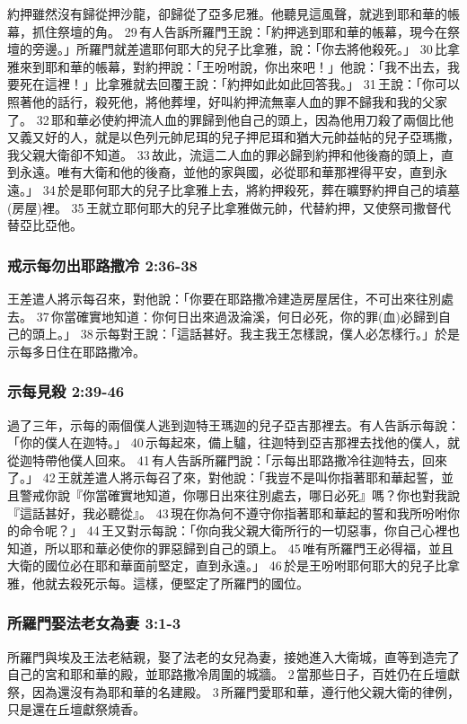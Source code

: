 約押雖然沒有歸從押沙龍，卻歸從了亞多尼雅。他聽見這風聲，就逃到耶和華的帳幕，抓住祭壇的角。 29 有人告訴所羅門王說：「約押逃到耶和華的帳幕，現今在祭壇的旁邊。」所羅門就差遣耶何耶大的兒子比拿雅，說：「你去將他殺死。」 30 比拿雅來到耶和華的帳幕，對約押說：「王吩咐說，你出來吧！」他說：「我不出去，我要死在這裡！」比拿雅就去回覆王說：「約押如此如此回答我。」 31 王說：「你可以照著他的話行，殺死他，將他葬埋，好叫約押流無辜人血的罪不歸我和我的父家了。 32 耶和華必使約押流人血的罪歸到他自己的頭上，因為他用刀殺了兩個比他又義又好的人，就是以色列元帥尼珥的兒子押尼珥和猶大元帥益帖的兒子亞瑪撒，我父親大衛卻不知道。 33 故此，流這二人血的罪必歸到約押和他後裔的頭上，直到永遠。唯有大衛和他的後裔，並他的家與國，必從耶和華那裡得平安，直到永遠。」 34 於是耶何耶大的兒子比拿雅上去，將約押殺死，葬在曠野約押自己的墳墓(房屋)裡。 35 王就立耶何耶大的兒子比拿雅做元帥，代替約押，又使祭司撒督代替亞比亞他。

\subsubsection{戒示每勿出耶路撒冷 2:36-38}
王差遣人將示每召來，對他說：「你要在耶路撒冷建造房屋居住，不可出來往別處去。 37 你當確實地知道：你何日出來過汲淪溪，何日必死，你的罪(血)必歸到自己的頭上。」 38 示每對王說：「這話甚好。我主我王怎樣說，僕人必怎樣行。」於是示每多日住在耶路撒冷。


\subsubsection{示每見殺 2:39-46}
過了三年，示每的兩個僕人逃到迦特王瑪迦的兒子亞吉那裡去。有人告訴示每說：「你的僕人在迦特。」 40 示每起來，備上驢，往迦特到亞吉那裡去找他的僕人，就從迦特帶他僕人回來。 41 有人告訴所羅門說：「示每出耶路撒冷往迦特去，回來了。」 42 王就差遣人將示每召了來，對他說：「我豈不是叫你指著耶和華起誓，並且警戒你說『你當確實地知道，你哪日出來往別處去，哪日必死』嗎？你也對我說『這話甚好，我必聽從』。 43 現在你為何不遵守你指著耶和華起的誓和我所吩咐你的命令呢？」 44 王又對示每說：「你向我父親大衛所行的一切惡事，你自己心裡也知道，所以耶和華必使你的罪惡歸到自己的頭上。 45 唯有所羅門王必得福，並且大衛的國位必在耶和華面前堅定，直到永遠。」 46 於是王吩咐耶何耶大的兒子比拿雅，他就去殺死示每。這樣，便堅定了所羅門的國位。

\subsubsection{所羅門娶法老女為妻 3:1-3}
所羅門與埃及王法老結親，娶了法老的女兒為妻，接她進入大衛城，直等到造完了自己的宮和耶和華的殿，並耶路撒冷周圍的城牆。 2 當那些日子，百姓仍在丘壇獻祭，因為還沒有為耶和華的名建殿。 3 所羅門愛耶和華，遵行他父親大衛的律例，只是還在丘壇獻祭燒香。




